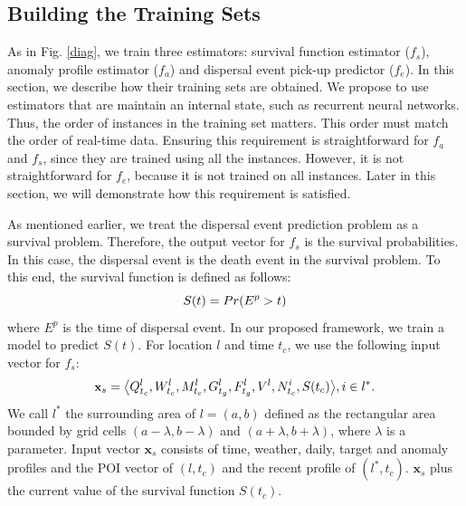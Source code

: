 \documentclass[letterpaper]{article} %
\begin{document}
\subsection{Building the Training Sets}
As in Fig. \ref{diag}, we train three estimators: survival function estimator ($f_s$), anomaly profile estimator ($f_a$) and dispersal event pick-up predictor ($f_e$). In this section, we describe how their training sets are obtained. We propose to use estimators that are maintain an internal state, such as recurrent neural networks. Thus, the order of instances in the training set matters. This order must match the order of real-time data. Ensuring this requirement is straightforward for $f_a$ and $f_s$, since they are trained using all the instances. However, it is not straightforward for $f_e$, because it is not trained on all instances. Later in this section, we will demonstrate how this requirement is satisfied.

As mentioned earlier, we treat the dispersal event prediction problem as a survival problem. Therefore, the output vector for $f_s$ is the survival probabilities. In this case, the dispersal event is the death event in the survival problem. To this end, the survival function is defined as follows:
\begin{equation}
\small
S(t)=Pr(E^p>t)
\label{survive}
\end{equation}
where $E^p$ is the time of dispersal event. In our proposed framework, we train a model to predict $S(t)$. For location $l$ and time $t_c$, we use the following input vector for $f_s$:
\begin{equation}
\small
\label{xs}
\textbf{x}_s=\big\langle Q^l_{t_c},W^l_{t_c},M^l_{t_c},G^{l}_{t_g},F^{l}_{t_g},V^l,N^i_{t_c}, S(t_c) \big\rangle, i\in l^*.
\end{equation}
We call $l^*$ the surrounding area of $l=(a,b)$ defined as the rectangular area bounded by grid cells $(a-\lambda,b-\lambda)$ and $(a+\lambda,b+\lambda)$, where $\lambda$ is a parameter. Input vector $\textbf{x}_s$ consists of time, weather, daily, target and anomaly profiles and the POI vector of $(l,t_c)$ and the recent profile of $(l^*,t_c)$. $\textbf{x}_s$ plus the current value of the survival function $S(t_c)$.
\end{document}
